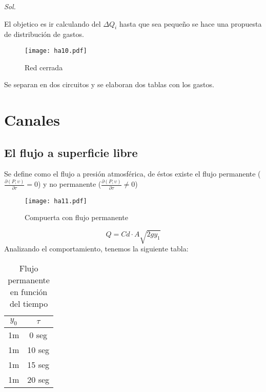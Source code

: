 \textit{ Sol. }

El objetico es ir calculando del $\Delta Q_i$ hasta que sea pequeño se hace una propuesta de distribución de gastos.
\begin{figure}[h!]
\centering
  \texttt{[image: ha10.pdf]}
  \caption{Red cerrada}
  \label{ha10}
\end{figure}
Se separan en dos circuitos y se elaboran dos tablas con los gastos.

\section{Canales}
\subsection{El flujo a superficie libre}
Se define como el flujo a presión atmosférica, de éstos existe el flujo permanente ($\frac{\partial (P,\upsilon) }{\partial \tau}=0$) y no permanente ($\frac{\partial \left(P,\upsilon\right)}{\partial \tau}\neq 0$)

\Schema{-1.4ex}{15ex}
{} { \Schema{-1ex}{8ex}
	{}
	{
		\medskip
		\schema
		{}
		{}
	}
	\Schema{-1ex}{5ex}
	{}
	{
		\medskip
		\schema
		{}
		{}}}
	

\begin{figure}[h!]
\centering
  \texttt{[image: ha11.pdf]}
  \caption{Compuerta con flujo permanente}
  \label{ha11}
\end{figure}
\begin{equation}
    Q = Cd\cdot A \sqrt{2g y_1}
\end{equation}
Analizando el comportamiento, tenemos la siguiente tabla:
\begin{table}[h!]
    \centering
    \begin{tabular}{@{}cc@{}}
    \toprule
    $y_0$ & $\tau$ \\ \midrule
    1m    & 0 seg  \\
    1m    & 10 seg \\
    1m    & 15 seg \\
    1m    & 20 seg \\ \bottomrule
    \end{tabular}
    \caption{Flujo permanente en función del tiempo}
    \label{tabha8}
\end{table}

